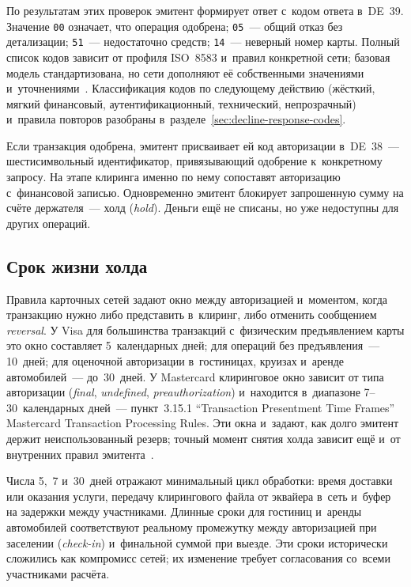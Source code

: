 По результатам этих проверок эмитент формирует ответ с~кодом ответа в~DE~39.
Значение \texttt{00} означает, что операция одобрена; \texttt{05}~--- общий
отказ без детализации; \texttt{51}~--- недостаточно средств; \texttt{14}~---
неверный номер карты. Полный список кодов зависит от
профиля ISO~8583 и~правил конкретной сети; базовая модель стандартизована, но
сети дополняют её собственными значениями
и~уточнениями~\cite{iso-8583-2023,visa-tadg,mc-rules}. Классификация кодов по
следующему действию (жёсткий, мягкий финансовый, аутентификационный,
технический, непрозрачный) и~правила повторов разобраны
в~разделе~\ref{sec:decline-response-codes}.

Если транзакция одобрена, эмитент присваивает ей код авторизации в~DE~38~---
шестисимвольный идентификатор, привязывающий одобрение к~конкретному запросу.
На этапе клиринга именно по нему сопоставят авторизацию с~финансовой записью.
Одновременно эмитент блокирует запрошенную сумму на счёте держателя~--- холд
(\textit{hold}). Деньги ещё не списаны, но уже недоступны для других операций.

\subsection*{Срок жизни холда}

Правила карточных сетей задают окно между авторизацией и~моментом, когда
транзакцию нужно либо представить в~клиринг, либо отменить сообщением
\textit{reversal}. У Visa для большинства транзакций с~физическим
предъявлением карты это окно составляет 5~календарных дней; для операций без
предъявления~--- 10~дней; для оценочной авторизации в~гостиницах, круизах
и~аренде автомобилей~--- до~30~дней. У Mastercard клиринговое окно зависит от
типа авторизации (\textit{final}, \textit{undefined}, \textit{preauthorization})
и~находится в~диапазоне
7--30~календарных дней~--- пункт~3.15.1 \enquote{Transaction Presentment Time
Frames} Mastercard Transaction Processing Rules. Эти окна и~задают, как долго
эмитент держит неиспользованный резерв; точный момент снятия холда зависит ещё
и~от внутренних правил эмитента~\cite{visa-core-rules,mc-tpr}.

Числа 5,~7 и~30~дней отражают минимальный цикл обработки: время доставки или
оказания услуги, передачу клирингового файла от эквайера в~сеть и~буфер на
задержки между участниками. Длинные сроки для гостиниц и~аренды автомобилей
соответствуют реальному промежутку между авторизацией при заселении
(\textit{check-in}) и~финальной суммой при выезде. Эти сроки исторически
сложились как компромисс сетей; их изменение требует согласования со~всеми
участниками расчёта.

